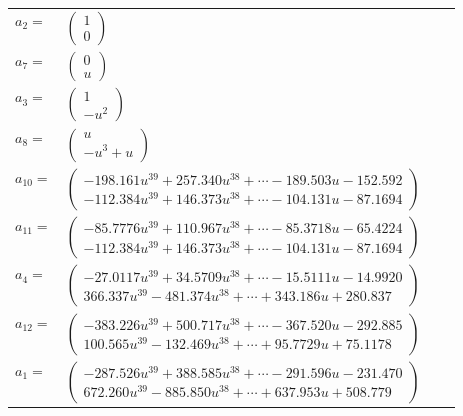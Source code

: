 \documentclass[1p]{elsarticle_modified}
\theoremstyle{definition}
\begin{document}
\begin{tabular}{m{7pt} m{180pt} m{7pt} m{180pt} }
\flushright $a_{2}=$&$\begin{pmatrix}1\\0\end{pmatrix}$ \\
\flushright $a_{7}=$&$\begin{pmatrix}0\\u\end{pmatrix}$ \\
\flushright $a_{3}=$&$\begin{pmatrix}1\\- u^2\end{pmatrix}$ \\
\flushright $a_{8}=$&$\begin{pmatrix}u\\- u^3+u\end{pmatrix}$ \\
\flushright $a_{10}=$&$\begin{pmatrix}-198.161 u^{39}+257.340 u^{38}+\cdots-189.503 u-152.592\\-112.384 u^{39}+146.373 u^{38}+\cdots-104.131 u-87.1694\end{pmatrix}$ \\
\flushright $a_{11}=$&$\begin{pmatrix}-85.7776 u^{39}+110.967 u^{38}+\cdots-85.3718 u-65.4224\\-112.384 u^{39}+146.373 u^{38}+\cdots-104.131 u-87.1694\end{pmatrix}$ \\
\flushright $a_{4}=$&$\begin{pmatrix}-27.0117 u^{39}+34.5709 u^{38}+\cdots-15.5111 u-14.9920\\366.337 u^{39}-481.374 u^{38}+\cdots+343.186 u+280.837\end{pmatrix}$ \\
\flushright $a_{12}=$&$\begin{pmatrix}-383.226 u^{39}+500.717 u^{38}+\cdots-367.520 u-292.885\\100.565 u^{39}-132.469 u^{38}+\cdots+95.7729 u+75.1178\end{pmatrix}$ \\
\flushright $a_{1}=$&$\begin{pmatrix}-287.526 u^{39}+388.585 u^{38}+\cdots-291.596 u-231.470\\672.260 u^{39}-885.850 u^{38}+\cdots+637.953 u+508.779\end{pmatrix}$ \\

\end{tabular}
\end{document}

